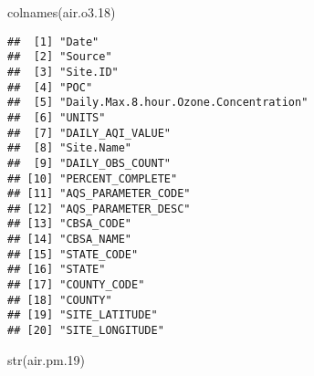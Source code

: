 \documentclass[
]{article}
\newenvironment{Shaded}{\begin{snugshade}}{\end{snugshade}}
\newcommand{\FloatTok}[1]{\textcolor[rgb]{0.00,0.00,0.81}{#1}}
\newcommand{\FunctionTok}[1]{\textcolor[rgb]{0.00,0.00,0.00}{#1}}
\newcommand{\NormalTok}[1]{#1}
\begin{document}
\begin{Shaded}
\begin{Highlighting}[]
\FunctionTok{colnames}\NormalTok{(air.o3}\FloatTok{.18}\NormalTok{)}
\end{Highlighting}
\end{Shaded}

\begin{verbatim}
##  [1] "Date"                                
##  [2] "Source"                              
##  [3] "Site.ID"                             
##  [4] "POC"                                 
##  [5] "Daily.Max.8.hour.Ozone.Concentration"
##  [6] "UNITS"                               
##  [7] "DAILY_AQI_VALUE"                     
##  [8] "Site.Name"                           
##  [9] "DAILY_OBS_COUNT"                     
## [10] "PERCENT_COMPLETE"                    
## [11] "AQS_PARAMETER_CODE"                  
## [12] "AQS_PARAMETER_DESC"                  
## [13] "CBSA_CODE"                           
## [14] "CBSA_NAME"                           
## [15] "STATE_CODE"                          
## [16] "STATE"                               
## [17] "COUNTY_CODE"                         
## [18] "COUNTY"                              
## [19] "SITE_LATITUDE"                       
## [20] "SITE_LONGITUDE"
\end{verbatim}

\begin{Shaded}
\begin{Highlighting}[]
\FunctionTok{str}\NormalTok{(air.pm}\FloatTok{.19}\NormalTok{)}
\end{Highlighting}
\end{Shaded}
\end{document}

